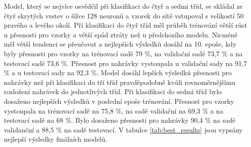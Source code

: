\documentclass[FM,BP]{tulthesis}
\begin{document}
Model, který se nejvíce osvědčil při klasifikaci do čtyř a sedmi tříd, se skládal ze čtyř skrytých vrstev o šířce 128 neuronů a vzorek do sítě vstupoval s velikostí 50 pravého a levého okolí. Při klasifikaci do čtyř tříd měl průběh trénování větší růst u přesnosti pro vzorky a větší spád ztráty než u předchozího modelu. Nicméně měl větší tendenci se přeučovat a nejlepších výsledků dosáhl na 10. epoše, kdy byly přesnosti pro vzorky na trénovací sadě 79 \%, na validační sadě 73,7 \% a na testovací sadě 73,6 \%. Přesnost pro nahrávky vystoupala u validační sady na 91,7 \% a u testovací sady na 92,3 \%. Model dosáhl lepších výsledků přesnosti pro nahrávky než při klasifikaci do tří tříd pravděpodobně kvůli rovnoměrnějšímu rozložení nahrávek do jednotlivých tříd. Při klasifikaci do sedmi tříd bylo dosaženo nejlepších výsledků v poslední epoše trénování. Přesnost pro vzorky vystoupala na trénovací sadě na 75,8 \%, na sadě validační na 69,3 \% a na testovací sadě na 68 \%. Bylo dosaženo přesnosti pro nahrávky 90,4 \% na sadě validanční a 88,5 \% na sadě testovací. V tabulce \ref{tab:best_results} jsou vypsány nejlepší výsledky finálních modelů.

\begin{table}[htb]
\centering
\caption{Přehled nejlepších výsledků finálních modelů}
\end{table}
\FloatBarrier
\end{document}

